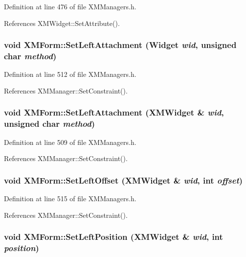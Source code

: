 Definition at line 476 of file XMManagers.h.

References XMWidget::Set\-Attribute().
\subsubsection{\setlength{\rightskip}{0pt plus 5cm}void XMForm::Set\-Left\-Attachment (Widget {\em wid}, unsigned char {\em method})\hspace{0.3cm}{\tt  [inline]}}\label{classXMForm_a16}




Definition at line 512 of file XMManagers.h.

References XMManager::Set\-Constraint().
\subsubsection{\setlength{\rightskip}{0pt plus 5cm}void XMForm::Set\-Left\-Attachment ({\bf XMWidget} \& {\em wid}, unsigned char {\em method})\hspace{0.3cm}{\tt  [inline]}}\label{classXMForm_a15}




Definition at line 509 of file XMManagers.h.

References XMManager::Set\-Constraint().
\subsubsection{\setlength{\rightskip}{0pt plus 5cm}void XMForm::Set\-Left\-Offset ({\bf XMWidget} \& {\em wid}, int {\em offset})\hspace{0.3cm}{\tt  [inline]}}\label{classXMForm_a17}




Definition at line 515 of file XMManagers.h.

References XMManager::Set\-Constraint().
\subsubsection{\setlength{\rightskip}{0pt plus 5cm}void XMForm::Set\-Left\-Position ({\bf XMWidget} \& {\em wid}, int {\em position})\hspace{0.3cm}{\tt  [inline]}}\label{classXMForm_a18}




